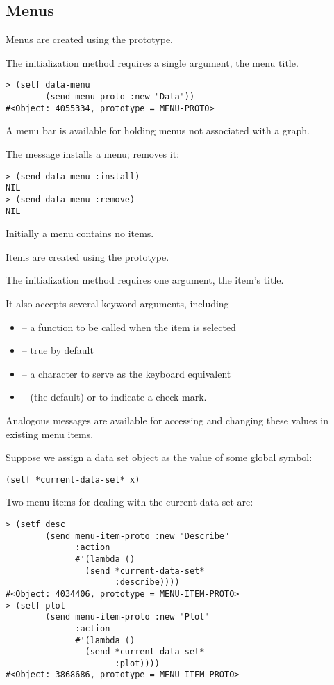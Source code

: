 \begin{slide}{}
\section{Menus}
Menus are created using the  prototype.

The initialization method requires a single argument, the menu title.
{\Large
\begin{verbatim}
> (setf data-menu
        (send menu-proto :new "Data"))
#<Object: 4055334, prototype = MENU-PROTO>
\end{verbatim}}
A menu bar is available for holding menus not associated with a graph.

The  message installs a menu;  removes it:
{\Large
\begin{verbatim}
> (send data-menu :install)
NIL
> (send data-menu :remove)
NIL
\end{verbatim}}
\end{slide}

\begin{slide}{}
Initially a menu contains no items.

Items are created using the  prototype.

The initialization method requires one argument, the item's title.

It also accepts several keyword arguments, including
\begin{itemize}
\item
{} -- a function to be called when the item is selected
\item
{} -- true by default
\item
{} -- a character to serve as the keyboard equivalent
\item
{} --  (the default) or  to indicate a
check mark.
\end{itemize}
Analogous messages are available for accessing and changing these
values in existing menu items.
\end{slide}

\begin{slide}{}
Suppose we assign a data set object as the value of some global
symbol:
{\Large
\begin{verbatim}
(setf *current-data-set* x)
\end{verbatim}}
Two menu items for dealing with the current data set are:
{\Large
\begin{verbatim}
> (setf desc
        (send menu-item-proto :new "Describe"
              :action
              #'(lambda ()
                (send *current-data-set*
                      :describe))))
#<Object: 4034406, prototype = MENU-ITEM-PROTO>
> (setf plot 
        (send menu-item-proto :new "Plot"
              :action 
              #'(lambda ()
                (send *current-data-set*
                      :plot))))
#<Object: 3868686, prototype = MENU-ITEM-PROTO>
\end{verbatim}}
\end{slide}

